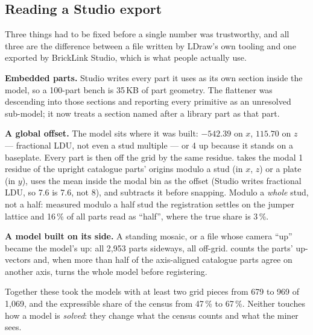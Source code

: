 \subsection{Reading a Studio export}
Three things had to be fixed before a single number was trustworthy, and all three are the difference between a file written by
LDraw's own tooling and one exported by BrickLink Studio, which is what people actually use.

\textbf{Embedded parts.} Studio writes every part it uses as its own  section inside the model, so a
100-part bench is 35\,KB of part geometry. The flattener was descending into those sections and reporting every primitive as an
unresolved sub-model; it now treats a section named after a library part as that part.

\textbf{A global offset.} The model sits where it was built: $-542.39$\ldu{} on $x$, $115.70$ on $z$ --- fractional LDU, not even a
stud multiple --- or 4\ldu{} up because it stands on a baseplate. Every part is then off the grid by the same residue.
 takes the modal 1\ldu{} residue of the upright catalogue parts' origins modulo a stud (in $x$, $z$) or a plate (in
$y$), uses the mean inside the modal bin as the offset (Studio writes fractional LDU, so 7.6 is 7.6, not 8), and subtracts it before
snapping. Modulo a \emph{whole} stud, not a half: measured modulo a half stud the registration settles on the jumper lattice and
16\,\% of all parts read as ``half'', where the true share is 3\,\%.

\textbf{A model built on its side.} A standing mosaic, or a file whose camera ``up'' became the model's up: all 2,953 parts
sideways, all off-grid.  counts the parts' up-vectors and, when more than half of the axis-aligned catalogue
parts agree on another axis, turns the whole model before registering.

Together these took the models with at least two grid pieces from 679 to 969 of 1,069, and the expressible share of the census from
47\,\% to 67\,\%. Neither touches how a model is \emph{solved}: they change what the census counts and what the miner sees.

